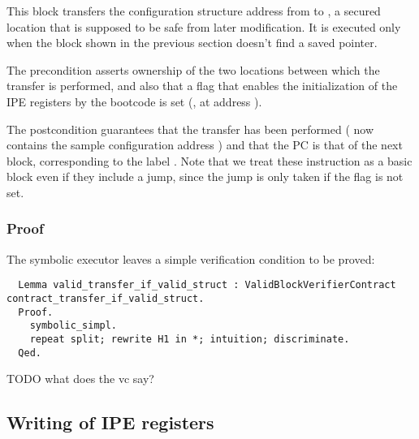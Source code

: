 This block transfers the configuration structure address from  to , \ie a secured location that is supposed to be safe from later modification. It is executed only when the block shown in the previous section doesn't find a saved pointer.

The precondition asserts ownership of the two locations between which the transfer is performed, and also that a flag that enables the initialization of the IPE registers by the bootcode is set (, \ie {} at address ).

The postcondition guarantees that the transfer has been performed ( now contains the sample configuration address ) and that the PC is that of the next block, corresponding to the label . Note that we treat these instruction as a basic block even if they include a jump, since the jump is only taken if the flag is not set.

\subsubsection{Proof}

The symbolic executor leaves a simple verification condition to be proved:

\begin{verbatim}
  Lemma valid_transfer_if_valid_struct : ValidBlockVerifierContract contract_transfer_if_valid_struct.
  Proof.
    symbolic_simpl.
    repeat split; rewrite H1 in *; intuition; discriminate.
  Qed.
\end{verbatim}

TODO what does the vc say?

\subsection{Writing of IPE registers}


